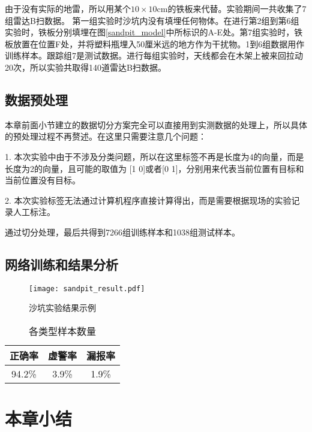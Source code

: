 由于没有实际的地雷，所以用某个$10\times 10$cm的铁板来代替。实验期间一共收集了7组雷达B扫数据。
第一组实验时沙坑内没有填埋任何物体。在进行第2组到第6组实验时，铁板分别填埋在图\ref{sandpit_model}中所标识的A-E处。第7组实验时，铁板放置在位置F处，并将塑料瓶埋入50厘米远的地方作为干扰物。1到6组数据用作训练样本。跟踪组7是测试数据。进行每组实验时，天线都会在木架上被来回拉动20次，所以实验共取得140道雷达B扫数据。
\subsection{数据预处理}
本章前面小节建立的数据切分方案完全可以直接用到实测数据的处理上，所以具体的预处理过程不再赘述。在这里只需要注意几个问题：

1. 本次实验中由于不涉及分类问题，所以在这里标签不再是长度为4的向量，而是长度为2的向量，且可能的取值为
[1 0]或者[0 1]，分别用来代表当前位置有目标和当前位置没有目标。

2. 本次实验标签无法通过计算机程序直接计算得出，而是需要根据现场的实验记录人工标注。

通过切分处理，最后共得到7266组训练样本和1038组测试样本。
\subsection{网络训练和结果分析}
\begin{figure}[htbp]
	\texttt{[image: sandpit\_result.pdf]}
	\caption[]{沙坑实验结果示例}
	\label{sandpit_result}
\end{figure}

\begin{table}[h]
	\caption{各类型样本数量} 
	\begin{tabular}{|c|c|c|} 
		\hline  
		正确率 & 虚警率 & 漏报率\\
		\hline
		94.2\% & 3.9\% & 1.9\%\\
		\hline
	\end{tabular}
	\label{table_sanpit_acc}
\end{table}
\section{本章小结}
